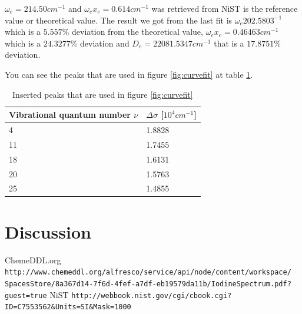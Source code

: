 \documentclass{article}
\begin{document}
$\omega_e= 214.50 cm^{-1}$ and $\omega_ex_e = 0.614 cm^{-1}$ was retrieved 
from NiST\cite{2} is the reference value or theoretical value.
The result we got from the last fit is $\omega_e 202.5803^{-1}$ which is a $5.557\%$ deviation from the theoretical value, $\omega_ex_e=0.46463cm^{-1}$ which is a $24.3277\%$ deviation and $D_e=22081.5347cm^{-1}$ that is a $17.8751\%$ deviation. 

You can see the peaks that are used in figure \ref{fig:curvefit} at table \ref{tabell}.

\vspace{5mm}
    \begin{table}[H]
        \captionsetup{width=0.85\textwidth}
        \centering
        \begin{tabular}{| l | l |}
            \hline
            Vibrational quantum number $\nu$    & $\Delta\sigma$ [$10^4 cm^{-1}$] \\ \hline
            4                    & 1.8828                 \\ \hline
            11                   & 1.7455                 \\ \hline
            18                   & 1.6131                 \\ \hline
            20                   & 1.5763                 \\ \hline
            25                   & 1.4855                 \\ \hline
        \end{tabular}
        \caption{Inserted peaks that are used in figure \ref{fig:curvefit}}
        \label{tabell}
    \end{table}

\section{Discussion}


\begin{thebibliography}{1}
 ChemeDDL.org \texttt{http://www.chemeddl.org/alfresco/service/api/node/content/workspace/\\SpacesStore/8a367d14-7f6d-4fef-a7df-eb19579da11b/IodineSpectrum.pdf?guest=true}
 NiST
\texttt{http://webbook.nist.gov/cgi/cbook.cgi?ID=C7553562\&Units=SI\&Mask=1000}

\end{thebibliography}
\end{document}
